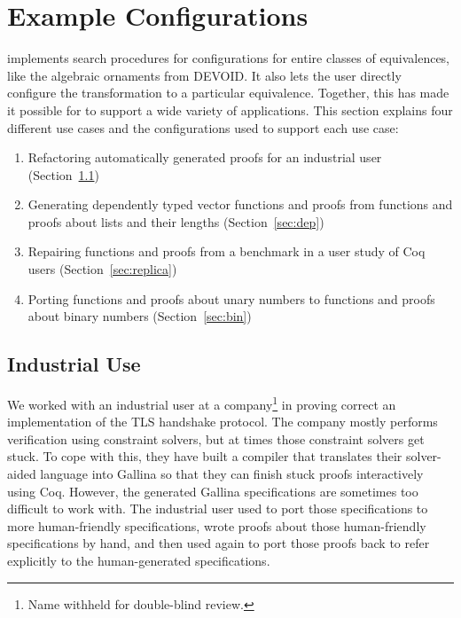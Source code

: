 \section{Example Configurations}
\label{sec:search}

\toolname implements search procedures for configurations for entire classes of equivalences,
like the algebraic ornaments from DEVOID.
It also lets the user directly configure the transformation to a particular equivalence.
Together, this has made it possible for \toolname to support a wide variety of applications.
This section explains four different use cases and the configurations used to support each use case:

\begin{enumerate}
\item Refactoring automatically generated proofs for an industrial user (Section~\ref{sec:industry})
\item Generating dependently typed vector functions and proofs from functions and proofs about lists and their lengths (Section~\ref{sec:dep})
\item Repairing functions and proofs from a benchmark in a user study of Coq users (Section~\ref{sec:replica})
\item Porting functions and proofs about unary numbers to functions and proofs about binary numbers (Section~\ref{sec:bin})
\end{enumerate}


\subsection{Industrial Use}
\label{sec:industry}

We worked with an industrial user at a company\footnote{Name withheld for double-blind review.} in proving
correct an implementation of the TLS handshake protocol.
The company mostly performs verification using constraint solvers, but at times those constraint solvers
get stuck.
To cope with this, they have built a compiler that translates their solver-aided language into Gallina
so that they can finish stuck proofs interactively using Coq.
However, the generated Gallina specifications are sometimes too difficult to work with.
The industrial user used \toolname to port those specifications to more human-friendly specifications,
wrote proofs about those human-friendly specifications by hand, and then used \toolname again
to port those proofs back to refer explicitly to the human-generated specifications.

